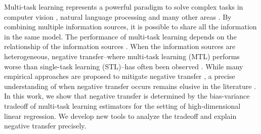 Multi-task learning represents a powerful paradigm to solve complex tasks in computer vision \cite{chexnet17,ZSSGM18}, natural language processing \cite{GLUE,superglue} and many other areas \cite{ZY17}.
By combining multiple information sources, it is possible to share all the information in the same model.
The performance of multi-task learning depends on the relationship of the information sources \cite{C97}.
When the information sources are heterogeneous, negative transfer--where multi-task learning (MTL)  performs worse than single-task learning (STL)--has often been observed \cite{PY09,AP16,BS17}.
While many empirical approaches are proposed to mitigate negative transfer \cite{ZY17}, a precise understanding of when negative transfer occurs remains elusive in the literature \cite{R17}.
In this work, we show that negative transfer is determined by the bias-variance tradeoff of multi-task learning estimators for the setting of high-dimensional linear regression. %
We develop new tools to analyze the tradeoff and explain negative transfer precisely.

